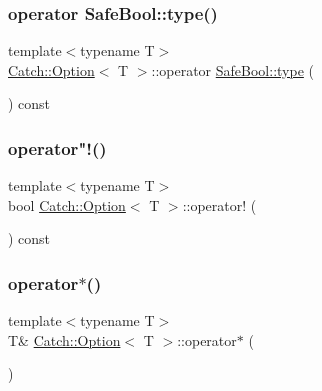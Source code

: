 \mbox{\label{class_catch_1_1_option_a8ed8de7b072f893c85df14913dbbe197}} 
\subsubsection{\texorpdfstring{operator Safe\+Bool\+::type()}{operator SafeBool::type()}}
{\footnotesize\ttfamily template$<$typename T$>$ \\
\hyperlink{class_catch_1_1_option}{Catch\+::\+Option}$<$ T $>$\+::operator \hyperlink{class_catch_1_1_safe_bool_a39eef9baed296299d625a54d54a2a958}{Safe\+Bool\+::type} (\begin{DoxyParamCaption}{ }\end{DoxyParamCaption}) const\hspace{0.3cm}{\ttfamily [inline]}}

\mbox{\label{class_catch_1_1_option_a96dccb86bdf45ee0c08e122b6133bef3}} 
\subsubsection{\texorpdfstring{operator"!()}{operator!()}}
{\footnotesize\ttfamily template$<$typename T$>$ \\
bool \hyperlink{class_catch_1_1_option}{Catch\+::\+Option}$<$ T $>$\+::operator! (\begin{DoxyParamCaption}{ }\end{DoxyParamCaption}) const\hspace{0.3cm}{\ttfamily [inline]}}

\mbox{\label{class_catch_1_1_option_afd989852fa453731c3190dac63caccb0}} 
\subsubsection{\texorpdfstring{operator$\ast$()}{operator*()}\hspace{0.1cm}{\footnotesize\ttfamily [1/2]}}
{\footnotesize\ttfamily template$<$typename T$>$ \\
T\& \hyperlink{class_catch_1_1_option}{Catch\+::\+Option}$<$ T $>$\+::operator$\ast$ (\begin{DoxyParamCaption}{ }\end{DoxyParamCaption})\hspace{0.3cm}{\ttfamily [inline]}}

